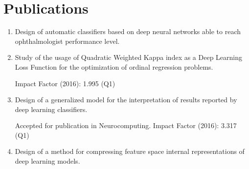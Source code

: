 \documentclass{article}
\begin{document}
	\section*{Publications}

\begin{enumerate}
	\item Design of automatic classifiers based on deep neural networks able to reach ophthalmologist performance level.
	
	
	\item Study of the usage of Quadratic Weighted Kappa index as a Deep Learning Loss Function for the optimization of ordinal regression problems.
	
	 Impact Factor (2016): 1.995 (Q1)
	
	\item Design of a generalized model for the interpretation of results reported by deep learning classifiers.
	
	 Accepted for publication in Neurocomputing. Impact Factor (2016): 3.317 (Q1)
	
	\item Design of a method for compressing feature space internal representations of deep learning models.
	
	 
\end{enumerate}

	
	
\end{document}
